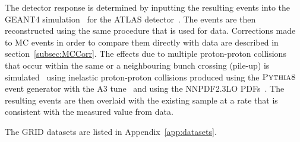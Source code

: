 The detector response is determined by inputting the resulting events into the GEANT4 simulation~\cite{Agostinelli2003250} for the ATLAS detector~\cite{Aad:2010ah}. The events are then reconstructed using the same procedure that is used for data. Corrections made to MC events in order to compare them directly with data are described in section~\ref{subsec:MCCorr}.
The effects due to multiple proton-proton collisions that occur within the same or a neighbouring bunch crossing (pile-up) is simulated~\cite{Marshall:2014mza} using inelastic proton-proton collisions produced using the $\textsc{Pythia8}$ event generator with the A3 tune~\cite{ATLAS:2016puo} and using the NNPDF2.3LO PDFs~\cite{Ball:2012cx}. The resulting events are
then overlaid with the existing sample at a rate that is consistent with the measured value from data.

The GRID datasets are listed in Appendix~\ref{app:datasets}.
